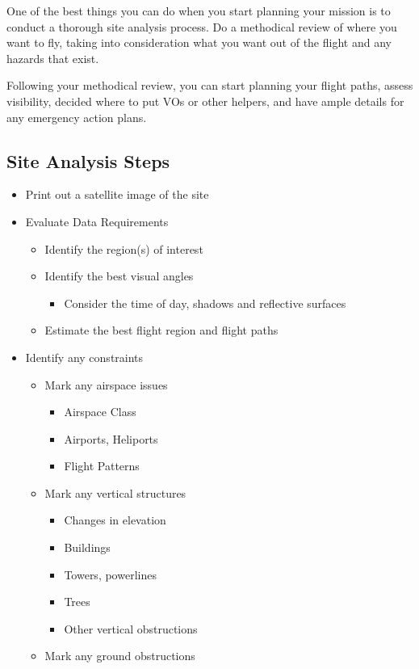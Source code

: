 \documentclass[
  12pt,
]{book}
\providecommand{\tightlist}{%
  \setlength{\itemsep}{0pt}\setlength{\parskip}{0pt}}
\begin{document}
One of the best things you can do when you start planning your mission is to conduct a thorough site analysis process. Do a methodical review of where you want to fly, taking into consideration what you want out of the flight and any hazards that exist.

Following your methodical review, you can start planning your flight paths, assess visibility, decided where to put VOs or other helpers, and have ample details for any emergency action plans.

\subsection{Site Analysis Steps}\label{site-analysis-steps}

\begin{itemize}
\tightlist
\item
  Print out a satellite image of the site
\item
  Evaluate Data Requirements

  \begin{itemize}
  \tightlist
  \item
    Identify the region(s) of interest
  \item
    Identify the best visual angles

    \begin{itemize}
    \tightlist
    \item
      Consider the time of day, shadows and reflective surfaces
    \end{itemize}
  \item
    Estimate the best flight region and flight paths
  \end{itemize}
\item
  Identify any constraints

  \begin{itemize}
  \tightlist
  \item
    Mark any airspace issues

    \begin{itemize}
    \tightlist
    \item
      Airspace Class
    \item
      Airports, Heliports
    \item
      Flight Patterns
    \end{itemize}
  \item
    Mark any vertical structures

    \begin{itemize}
    \tightlist
    \item
      Changes in elevation
    \item
      Buildings
    \item
      Towers, powerlines
    \item
      Trees
    \item
      Other vertical obstructions
    \end{itemize}
  \item
    Mark any ground obstructions


\end{itemize}
\end{itemize}
\end{document}
